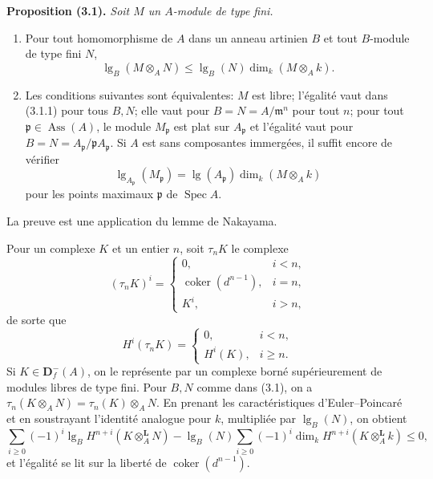 \documentclass[11pt]{article}
\DeclareMathOperator{\Spec}{Spec}
\DeclareMathOperator{\Ass}{Ass}
\DeclareMathOperator{\coker}{coker}
\newcommand{\bD}{\mathbf D}
\newcommand{\length}{\operatorname{lg}}
\newenvironment{named}[1]{\par\medskip\noindent\textbf{#1}\itshape}{\par\medskip}
\begin{document}
\begin{named}{Proposition (3.1).}
Soit $M$ un $A$-module de type fini.
\begin{enumerate}[label=(\roman*)]
\item Pour tout homomorphisme de $A$ dans un anneau artinien $B$ et tout $B$-module de type fini $N$,
\begin{equation}\tag{3.1.1}
\length_B(M\otimes_A N)\le \length_B(N)\dim_k(M\otimes_Ak).
\end{equation}
\item Les conditions suivantes sont équivalentes: $M$ est libre; l'égalité vaut dans (3.1.1) pour tous $B,N$; elle vaut pour $B=N=A/\mathfrak m^n$ pour tout $n$; pour tout $\mathfrak p\in\Ass(A)$, le module $M_\mathfrak p$ est plat sur $A_\mathfrak p$ et l'égalité vaut pour $B=N=A_\mathfrak p/\mathfrak pA_\mathfrak p$. Si $A$ est sans composantes immergées, il suffit encore de vérifier
\begin{equation}\tag{3.1.2'}
\length_{A_\mathfrak p}(M_\mathfrak p)=\length(A_\mathfrak p)\dim_k(M\otimes_Ak)
\end{equation}
pour les points maximaux $\mathfrak p$ de $\Spec A$.
\end{enumerate}
\end{named}
La preuve est une application du lemme de Nakayama.

Pour un complexe $K$ et un entier $n$, soit $\tau_nK$ le complexe
\begin{equation}\tag{3.2.1}
(\tau_nK)^i=\begin{cases}
0,&i<n,\\
\coker(d^{n-1}),&i=n,\\
K^i,&i>n,
\end{cases}
\end{equation}
de sorte que
\begin{equation}\tag{3.2.2}
H^i(\tau_nK)=\begin{cases}0,&i<n,\\ H^i(K),&i\ge n.\end{cases}
\end{equation}
Si $K\in\bD^-_f(A)$, on le représente par un complexe borné supérieurement de modules libres de type fini. Pour $B,N$ comme dans (3.1), on a $\tau_n(K\otimes_A N)=\tau_n(K)\otimes_A N$. En prenant les caractéristiques d'Euler--Poincaré et en soustrayant l'identité analogue pour $k$, multipliée par $\length_B(N)$, on obtient
\begin{equation}\tag{3.2.3}
\sum_{i\ge0}(-1)^i\length_B H^{n+i}(K\otimes_A^\mathbf L N)-\length_B(N)\sum_{i\ge0}(-1)^i\dim_k H^{n+i}(K\otimes_A^\mathbf L k)
\le0,
\end{equation}
et l'égalité se lit sur la liberté de $\coker(d^{n-1})$.
\end{document}
